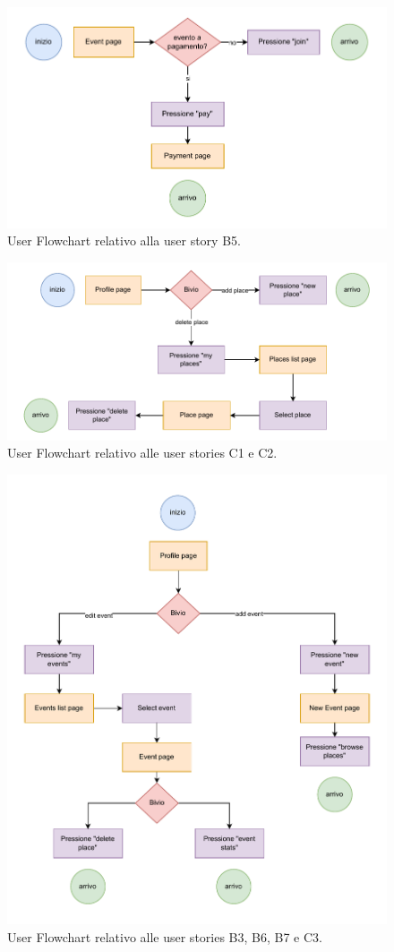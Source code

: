 \documentclass[9pt]{extarticle}
\begin{document}
\begin{figure}[!htb]
	\centering
	\includegraphics[width=0.8\linewidth]{./images/B5.pdf}
	\caption{User Flowchart relativo alla user story B5.}
	\label{fig:B5}
\end{figure}

\newpage  

\begin{figure}[!htb]
	\centering
	\includegraphics[width=0.8\linewidth]{./images/C1-C2.pdf}
	\caption{User Flowchart relativo alle user stories C1 e C2.}
	\label{fig:C1-C2}
\end{figure}

\begin{figure}[!htb]
	\centering
	\includegraphics[width=0.8\linewidth]{./images/B3-B6-B7-C3.pdf}
	\caption{User Flowchart relativo alle user stories B3, B6, B7 e C3.}
	\label{fig:B3-B6-B7-C3}
\end{figure}
\end{document}
